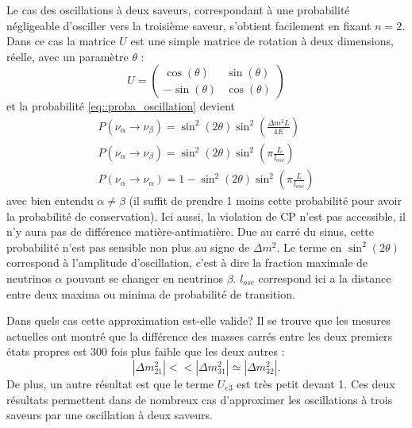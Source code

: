             Le cas des oscillations à deux saveurs, correspondant à une probabilité négligeable d'osciller vers la troisième saveur, s'obtient facilement en fixant $n=2$. Dans ce cas la matrice $U$ est une simple matrice de rotation à deux dimensions, réelle, avec un paramètre $\theta$ :
            \begin{equation}\label{eq::two_flavor_pmns}
                U = \left(\begin{matrix}
                    \cos(\theta) & \sin(\theta) \\
                    -\sin(\theta) & \cos(\theta)
                \end{matrix}\right)
            \end{equation}
            et la probabilité \eqref{eq::proba_oscillation} devient
            \begin{eqnarray}
                \label{eq::two_flavors}
                P(\nu_{\alpha}\to\nu_{\beta}) = \sin^2(2\theta)\sin^2\left(\frac{\Delta m^2 L}{4E}\right) \\ 
                \label{eq::two_flavors_length}
                P(\nu_{\alpha}\to\nu_{\beta}) = \sin^2(2\theta)\sin^2\left(\pi\frac{L}{l_{osc}}\right) \\
                \label{eq::two_flavors_survival}
                P(\nu_{\alpha}\to\nu_{\alpha}) = 1- \sin^2(2\theta)\sin^2\left(\pi\frac{L}{l_{osc}}\right)
            \end{eqnarray}
            avec bien entendu $\alpha\ne \beta$ (il suffit de prendre 1 moins cette probabilité pour avoir la probabilité de conservation). Ici aussi, la violation de CP n'est pas accessible, il n'y aura pas de différence matière-antimatière. Due au carré du sinus, cette probabilité n'est pas sensible non plus au signe de $\Delta m^2$. Le terme en $\sin^2(2\theta)$ correspond à l'amplitude d'oscillation, c'est à dire la fraction maximale de neutrinos $\alpha$ pouvant se changer en neutrinos $\beta$. $l_{osc}$ correspond ici a la distance entre deux maxima ou minima de probabilité de transition.
            
            Dans quels cas cette approximation est-elle valide? Il se trouve que les mesures actuelles ont montré que la différence des masses carrés entre les deux premiers états propres est 300 fois plus faible que les deux autres : 
            \begin{equation}
                |\Delta m^2_{21}| << |\Delta m^2_{31}| \simeq |\Delta m^2_{32}|.
            \end{equation}
            De plus, un autre résultat est que le terme $U_{e3}$ est très petit devant 1. Ces deux résultats permettent dans de nombreux cas d'approximer les oscillations à trois saveurs par une oscillation à deux saveurs.
            
